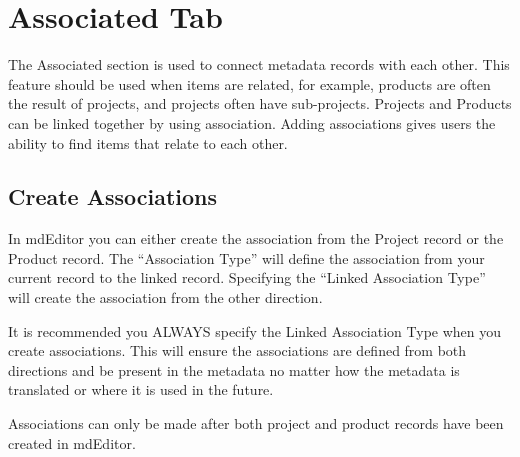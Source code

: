 \documentclass[
]{book}
\makeatletter
\newenvironment{kframe}{%
\medskip{}
\setlength{\fboxsep}{.8em}
 \def\at@end@of@kframe{}%
 \ifinner\ifhmode%
  \def\at@end@of@kframe{\end{minipage}}%
  \begin{minipage}{\columnwidth}%
 \fi\fi%
 \def\FrameCommand##1{\hskip\@totalleftmargin \hskip-\fboxsep
 \colorbox{shadecolor}{##1}\hskip-\fboxsep
     \hskip-\linewidth \hskip-\@totalleftmargin \hskip\columnwidth}%
 \MakeFramed {\advance\hsize-\width
   \@totalleftmargin\z@ \linewidth\hsize
   \@setminipage}}%
 {\par\unskip\endMakeFramed%
 \at@end@of@kframe}
\newenvironment{rmdblock}[1]
  {
  \begin{itemize}
  \renewcommand{\labelitemi}{
    \raisebox{-.7\height}[0pt][0pt]{
      {\setkeys{Gin}{width=3em,keepaspectratio}\texttt{[image: images/\#1]}}
    }
  }
  \setlength{\fboxsep}{1em}
  \begin{kframe}
  \item
  }
  {
  \end{kframe}
  \end{itemize}
  }
\newenvironment{rmdwarning}
  {\begin{rmdblock}{warning}}
  {\end{rmdblock}}
\makeatother
\begin{document}
\hypertarget{project-associations}{%
\section*{Associated Tab}\label{project-associations}}

The Associated section is used to connect metadata records with each other. This feature should be used when items are related, for example, products are often the result of projects, and projects often have sub-projects. Projects and Products can be linked together by using association. Adding associations gives users the ability to find items that relate to each other.

\hypertarget{create-associations}{%
\subsection*{Create Associations}\label{create-associations}}

In mdEditor you can either create the association from the Project record or the Product record. The ``Association Type'' will define the association from your current record to the linked record. Specifying the ``Linked Association Type'' will create the association from the other direction.

\begin{rmdwarning}
It is recommended you ALWAYS specify the Linked Association Type when
you create associations. This will ensure the associations are defined
from both directions and be present in the metadata no matter how the
metadata is translated or where it is used in the future.
\end{rmdwarning}

Associations can only be made after both project and product records have been created in mdEditor.
\end{document}
